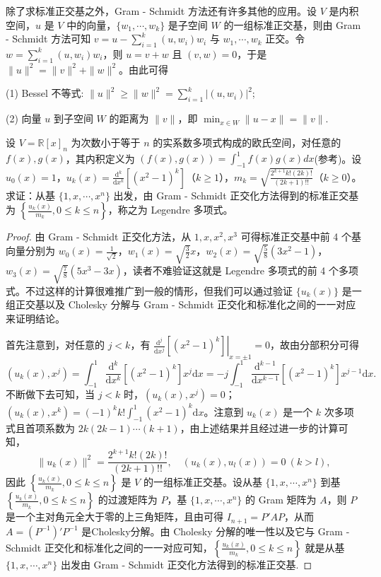 \documentclass[../../main.tex]{subfiles}
\begin{document}
除了求标准正交基之外，Gram - Schmidt 方法还有许多其他的应用。设 $V$ 是内积空间，$u$ 是 $V$ 中的向量，$\{w_1,\cdots,w_k\}$ 是子空间 $W$ 的一组标准正交基，则由 Gram - Schmidt 方法可知 $v = u - \sum_{i = 1}^{k}(u,w_i)w_i$ 与 $w_1,\cdots,w_k$ 正交。令 $w = \sum_{i = 1}^{k}(u,w_i)w_i$，则 $u = v + w$ 且 $(v,w) = 0$，于是 $\|u\|^2 = \|v\|^2 + \|w\|^2$。由此可得

(1) Bessel 不等式: $\|u\|^2\geq\|w\|^2 = \sum_{i = 1}^{k}|(u,w_i)|^2$;

(2) 向量 $u$ 到子空间 $W$ 的距离为 $\|v\|$，即 $\min_{x\in W}\|u - x\| = \|v\|$. 

\begin{example}\label{example:例9.11}
设 $V = \mathbb{R}[x]_n$ 为次数小于等于 $n$ 的实系数多项式构成的欧氏空间，对任意的 $f(x),g(x)$，其内积定义为 $(f(x),g(x)) = \int_{-1}^{1}f(x)g(x)dx$(参考)。设 $u_0(x)=1$，$u_k(x)=\frac{\mathrm{d}^k}{\mathrm{d}x^k}[(x^2 - 1)^k]$（$k\geq1$），$m_k = \sqrt{\frac{2^{k + 1}k!(2k)!}{(2k + 1)!!}}$（$k\geq0$）。求证：从基 $\{1,x,\cdots,x^n\}$ 出发，由 Gram - Schmidt 正交化方法得到的标准正交基为 $\left\{\frac{u_k(x)}{m_k},0\leq k\leq n\right\}$，称之为 Legendre 多项式。
\end{example}
\begin{proof}
由 Gram - Schmidt 正交化方法，从 $1,x,x^2,x^3$ 可得标准正交基中前 4 个基向量分别为 $w_0(x)=\frac{1}{\sqrt{2}}$，$w_1(x)=\sqrt{\frac{3}{2}}x$，$w_2(x)=\sqrt{\frac{5}{8}}(3x^2 - 1)$，$w_3(x)=\sqrt{\frac{7}{8}}(5x^3 - 3x)$，读者不难验证这就是 Legendre 多项式的前 4 个多项式。不过这样的计算很难推广到一般的情形，但我们可以通过验证 $\{u_k(x)\}$ 是一组正交基以及 Cholesky 分解与 Gram - Schmidt 正交化和标准化之间的一一对应来证明结论。

首先注意到，对任意的 $j < k$，有 $\left.\frac{\mathrm{d}^j}{\mathrm{d}x^j}[(x^2 - 1)^k]\right|_{x = \pm1}=0$，故由分部积分可得
\[
(u_k(x),x^j)=\int_{-1}^{1}\frac{\mathrm{d}^k}{\mathrm{d}x^k}[(x^2 - 1)^k]x^j\mathrm{d}x=-j\int_{-1}^{1}\frac{\mathrm{d}^{k - 1}}{\mathrm{d}x^{k - 1}}[(x^2 - 1)^k]x^{j - 1}\mathrm{d}x.
\]
不断做下去可知，当 $j < k$ 时，$(u_k(x),x^j)=0$；$(u_k(x),x^k)=(-1)^kk!\int_{-1}^{1}(x^2 - 1)^k\mathrm{d}x$。注意到 $u_k(x)$ 是一个 $k$ 次多项式且首项系数为 $2k(2k - 1)\cdots(k + 1)$，由上述结果并且经过进一步的计算可知，
\[
\|u_k(x)\|^2=\frac{2^{k + 1}k!(2k)!}{(2k + 1)!!},\quad (u_k(x),u_l(x))=0\ (k > l),
\]
因此 $\left\{\frac{u_k(x)}{m_k},0\leq k\leq n\right\}$ 是 $V$ 的一组标准正交基。设从基 $\{1,x,\cdots,x^n\}$ 到基 $\left\{\frac{u_k(x)}{m_k},0\leq k\leq n\right\}$ 的过渡矩阵为 $P$，基 $\{1,x,\cdots,x^n\}$ 的 Gram 矩阵为 $A$，则 $P$ 是一个主对角元全大于零的上三角矩阵，且由可得 $I_{n + 1}=P'AP$，从而 $A=(P^{-1})'P^{-1}$ 是Cholesky分解。由 Cholesky 分解的唯一性以及它与 Gram - Schmidt 正交化和标准化之间的一一对应可知，$\left\{\frac{u_k(x)}{m_k},0\leq k\leq n\right\}$ 就是从基 $\{1,x,\cdots,x^n\}$ 出发由 Gram - Schmidt 正交化方法得到的标准正交基.
\end{proof}
\end{document}
